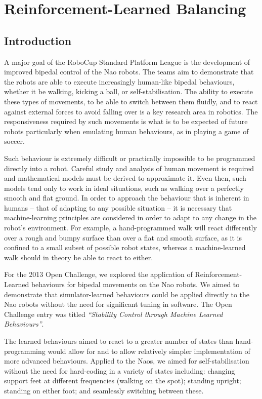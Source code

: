 \chapter{Reinforcement-Learned Balancing}
\label{chap:ns}

\section{Introduction}

A major goal of the RoboCup Standard Platform League is the development of improved bipedal control of the Nao robots. The teams aim to demonstrate that the robots are able to execute increasingly human-like bipedal behaviours, whether it be walking, kicking a ball, or self-stabilisation. The ability to execute these types of movements, to be able to switch between them fluidly, and to react against external forces to avoid falling over is a key research area in robotics. The responsiveness required by such movements is what is to be expected of future robots particularly when emulating human behaviours, as in playing a game of soccer.

Such behaviour is extremely difficult or practically impossible to be programmed directly into a robot. Careful study and analysis of human movement is required and mathematical models must be derived to approximate it. Even then, such models tend only to work in ideal situations, such as walking over a perfectly smooth and flat ground. In order to approach the behaviour that is inherent in humans -- that of adapting to any possible situation -- it is necessary that machine-learning principles are considered in order to adapt to any change in the robot's environment. For example, a hand-programmed walk will react differently over a rough and bumpy surface than over a flat and smooth surface, as it is confined to a small subset of possible robot states, whereas a machine-learned walk should in theory be able to react to either.

For the 2013 Open Challenge, we explored the application of Reinforcement-Learned behaviours for bipedal movements on the Nao robots. We aimed to demonstrate that simulator-learned behaviours could be applied directly to the Nao robots without the need for significant tuning in software. The Open Challenge entry was titled \textit{``Stability Control through Machine Learned Behaviours''}\cite{openchallenge}.

The learned behaviours aimed to react to a greater number of states than hand-programming would allow for and to allow relatively simpler implementation of more advanced behaviours. Applied to the Naos, we aimed for self-stabilisation without the need for hard-coding in a variety of states including: changing support feet at different frequencies (walking on the spot); standing upright; standing on either foot; and seamlessly switching between these. 

